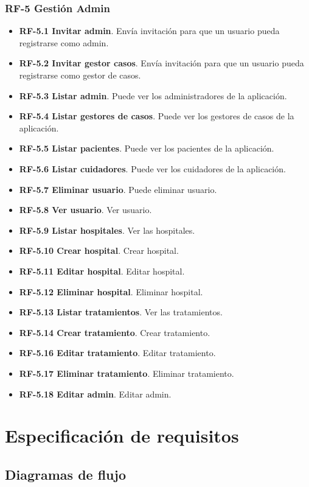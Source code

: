 \subsubsection{RF-5 Gestión Admin}
\begin{itemize}
\tightlist 
\item \textbf{RF-5.1 Invitar admin}. Envía invitación para que un usuario pueda registrarse como admin.
\item \textbf{RF-5.2 Invitar gestor casos}. Envía invitación para que un usuario pueda registrarse como gestor de casos.
\item \textbf{RF-5.3 Listar admin}. Puede ver los administradores de la aplicación.
\item \textbf{RF-5.4 Listar gestores de casos}. Puede ver los gestores de casos de la aplicación.
\item \textbf{RF-5.5 Listar pacientes}. Puede ver los pacientes de la aplicación.
\item \textbf{RF-5.6 Listar cuidadores}. Puede ver los cuidadores de la aplicación.
\item \textbf{RF-5.7 Eliminar usuario}. Puede eliminar usuario.
\item \textbf{RF-5.8 Ver usuario}. Ver usuario.
\item \textbf{RF-5.9 Listar hospitales}. Ver las hospitales.
\item \textbf{RF-5.10 Crear hospital}. Crear hospital.
\item \textbf{RF-5.11 Editar hospital}. Editar hospital.
\item \textbf{RF-5.12 Eliminar hospital}. Eliminar hospital.
\item \textbf{RF-5.13 Listar tratamientos}. Ver las tratamientos.
\item \textbf{RF-5.14 Crear tratamiento}. Crear tratamiento.
\item \textbf{RF-5.16 Editar tratamiento}. Editar tratamiento.
\item \textbf{RF-5.17 Eliminar tratamiento}. Eliminar tratamiento.
\item \textbf{RF-5.18 Editar admin}. Editar admin.
\end{itemize}

\section{Especificación de requisitos}
\subsection{Diagramas de flujo}
